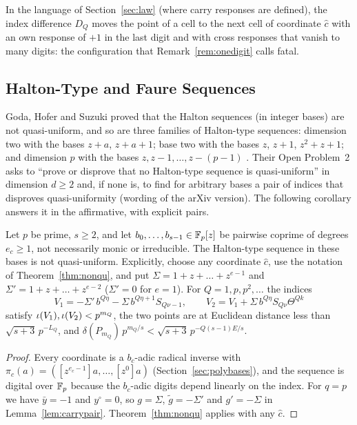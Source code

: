In the language of Section~\ref{sec:law} (where carry responses are defined), the index difference $D_Q$ moves the point of a cell to the next cell of coordinate $\hat c$ with an own response of $+1$ in the last digit and with cross responses that vanish to many digits: the configuration that Remark~\ref{rem:onedigit} calls fatal.

\subsection{Halton-Type and Faure Sequences}
Goda, Hofer and Suzuki proved that the Halton sequences (in integer bases) are not quasi-uniform, and so are three families of Halton-type sequences: dimension two with the bases $z+a$, $z+a+1$; base two with the bases $z$, $z+1$, $z^2+z+1$; and dimension $p$ with the bases $z,z-1,\dots,z-(p-1)$ \cite[Thm.~2]{GHS26}. Their Open Problem~2 asks to ``prove or disprove that no Halton-type sequence is quasi-uniform'' in dimension $d\ge2$ and, if none is, to find for arbitrary bases a pair of indices that disproves quasi-uniformity \cite[Open Problem~2]{GHS26} (wording of the arXiv version). The following corollary answers it in the affirmative, with explicit pairs.

\begin{corollary}\label{cor:halton}
Let $p$ be prime, $s\ge2$, and let $b_0,\dots,b_{s-1}\in\mathbb{F}_p[z]$ be pairwise coprime of degrees $e_c\ge1$, not necessarily monic or irreducible. The Halton-type sequence in these bases \cite[Def.~2]{GHS26} is not quasi-uniform. Explicitly, choose any coordinate $\hat c$, use the notation of Theorem~\ref{thm:nonqu}, and put $\Sigma=1+z+\dots+z^{e-1}$ and $\Sigma'=1+z+\dots+z^{e-2}$ ($\Sigma'=0$ for $e=1$). For $Q=1,p,p^2,\dots$ the indices
\[
V_1=-\Sigma'\,b^{Q\eta}-\Sigma\,b^{Q\eta+1}S_{Q\nu-1},\qquad V_2=V_1+\Sigma\,b^{Q\eta}S_{Q\nu}\Theta^{Qk}
\]
satisfy $\iota(V_1),\iota(V_2)<p^{m_Q}$, the two points are at Euclidean distance less than $\sqrt{s+3}\,p^{-L_Q}$, and $\delta(P_{m_Q})\,p^{m_Q/s}<\sqrt{s+3}\,p^{-Q(s-1)E/s}$.
\end{corollary}

\begin{proof}
Every coordinate is a $b_c$-adic radical inverse with $\pi_c(a)=([z^{e_c-1}]a,\dots,[z^0]a)$ (Section~\ref{sec:polybases}), and the sequence is digital over $\mathbb{F}_p$ because the $b_c$-adic digits depend linearly on the index. For $q=p$ we have $\bar y=-1$ and $y^\circ=0$, so $g=\Sigma$, $\tilde g=-\Sigma'$ and $g'=-\Sigma$ in Lemma~\ref{lem:carrypair}. Theorem~\ref{thm:nonqu} applies with any $\hat c$.
\end{proof}

